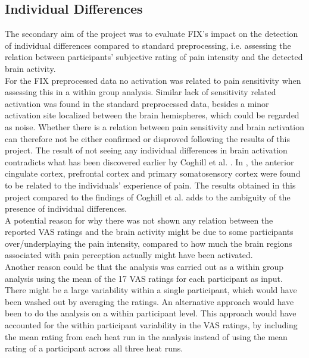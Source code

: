  

 

\subsection*{Individual Differences}
The secondary aim of the project was to evaluate FIX’s impact on the detection of individual differences compared to standard preprocessing, i.e. assessing the relation between participants’ subjective rating of pain intensity and the detected brain activity. \\
For the FIX preprocessed data no activation was related to pain sensitivity when assessing this in a within group analysis. Similar lack of sensitivity related activation was found in the standard preprocessed data, besides a minor activation site localized between the brain hemispheres, which could be regarded as noise. Whether there is a relation between pain sensitivity and brain activation can therefore not be either confirmed or disproved following the results of this project. The result of not seeing any individual differences in brain activation contradicts what has been discovered earlier by Coghill et al. \cite{Coghill2003}. In \cite{Coghill2003}, the anterior cingulate cortex, prefrontal cortex and primary somatosensory cortex were found to be related to the individuals' experience of pain. The results obtained in this project compared to the findings of Coghill et al. adds to the ambiguity of the presence of individual differences.  \\
A potential reason for why there was not shown any relation between the reported VAS ratings and the brain activity might be due to some participants over/underplaying the pain intensity, compared to how much the brain regions associated with pain perception actually might have been activated. \\
Another reason could be that the analysis was carried out as a within group analysis using the mean of the 17 VAS ratings for each participant as input. There might be a large variability within a single participant, which would have been washed out by averaging the ratings. An alternative approach would have been to do the analysis on a within participant level. This approach would have accounted for the within participant variability in the VAS ratings, by including the mean rating from each heat run in the analysis instead of using the mean rating of a participant across all three heat runs. 


